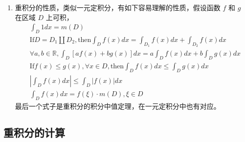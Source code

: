\begin{enumerate}
    \item 重积分的性质，类似一元定积分，有如下容易理解的性质，假设函数 $f$ 和 $g$ 在区域 $D$ 上可积，
    \begin{align*}
    &\int_D1dx=m(D) \\
    &\text{If}D=D_1\amalg D_2,\text{then}\int_Df(x)dx=\int_{D_1}f(x)dx+\int_{D_2}f(x)dx \\
    &\forall a,b\in\mathbb{R}, \int_D[af(x)+bg(x)]dx=a\int_Df(x)dx+b\int_Dg(x)dx \\
    &\text{If}f(x)\leq g(x),\forall x\in D,\text{then}\int_Df(x)dx\leq\int_Dg(x)dx \\
    &\left|\int_Df(x)dx\right|\leq\int_D|f(x)|dx \\
    & \int_Df(x)dx=f(\xi)\cdot m(D), \xi \in D
    \end{align*}
    最后一个式子是重积分的积分中值定理，在一元定积分中也有对应。
\end{enumerate}

\subsection{重积分的计算}
